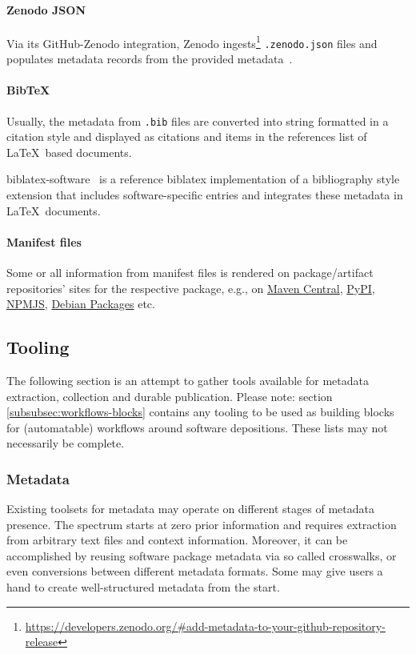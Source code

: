 \documentclass[11pt,a4paper]{scrartcl}
\newcommand{\fn}[1]{\texttt{#1}}
\begin{document}
\paragraph{Zenodo JSON}\label{par:metadata-integrations-zenodo-json}
Via its GitHub-Zenodo integration, Zenodo ingests\footnote{\url{https://developers.zenodo.org/\#add-metadata-to-your-github-repository-release}}
\fn{.zenodo.json} files and populates metadata records from the provided metadata~\cite{sw:invenio-github}.

\paragraph{BibTeX}\label{par:metadata-integrations-bibtex} 
Usually, the metadata from  \fn{.bib} files are converted into string formatted in a citation style and displayed 
as citations and items in the references list of \LaTeX\ based documents.

biblatex-software~\cite{sw:biblatex-software} is a reference biblatex implementation of a bibliography style extension
that includes software-specific  entries and integrates these metadata in \LaTeX\ documents.

\paragraph{Manifest files}\label{par:metadata-integrations-manifests}
Some or all information from manifest files is rendered on package/artifact repositories’ sites for the respective package,
e.g., on \href{https://mvnrepository.com}{Maven Central}, \href{https://pypi.org}{PyPI}, 
\href{https://www.npmjs.com}{NPMJS}, \href{https://www.debian.org/distrib/packages}{Debian Packages} etc. 



\subsection{Tooling}\label{sec:tooling}
The following section is an attempt to gather tools available for metadata extraction, collection and durable publication.
Please note: section \ref{subsubsec:workflows-blocks} contains any tooling to be used as building blocks
for (automatable) workflows around software depositions. These lists may not necessarily be complete.

\subsubsection{Metadata}\label{subsec:tooling-metadata}
Existing toolsets for metadata may operate on different stages of metadata presence. The spectrum starts at zero 
prior information and requires extraction from arbitrary text files and context information. Moreover, it can be 
accomplished by reusing software package metadata via so called crosswalks, or even  conversions between different
metadata formats. Some may give users a hand to create well-structured metadata from the start.
\end{document}
